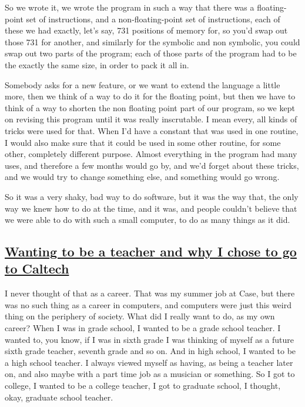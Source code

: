 \documentclass[]{article}
\begin{document}
So we wrote it, we wrote the program in such a way that there was a
floating-point set of instructions, and a non-floating-point set of
instructions, each of these we had exactly, let's say, 731 positions of
memory for, so you'd swap out those 731 for another, and similarly for
the symbolic and non symbolic, you could swap out two parts of the
program; each of those parts of the program had to be the exactly the
same size, in order to pack it all in.

Somebody asks for a new feature, or we want to extend the language a
little more, then we think of a way to do it for the floating point, but
then we have to think of a way to shorten the non floating point part of
our program, so we kept on revising this program until it was really
inscrutable. I mean every, all kinds of tricks were used for that. When
I'd have a constant that was used in one routine, I would also make sure
that it could be used in some other routine, for some other, completely
different purpose. Almost everything in the program had many uses, and
therefore a few months would go by, and we'd forget about these tricks,
and we would try to change something else, and something would go wrong.

So it was a very shaky, bad way to do software, but it was the way that,
the only way we knew how to do at the time, and it was, and people
couldn't believe that we were able to do with such a small computer, to
do as many things as it did.

\subsection{\texorpdfstring{\href{http://webofstories.com/play/17085}{Wanting
to be a teacher and why I chose to go to
Caltech}}{Wanting to be a teacher and why I chose to go to Caltech}}\label{wanting-to-be-a-teacher-and-why-i-chose-to-go-to-caltech}

I never thought of that as a career. That was my summer job at Case, but
there was no such thing as a career in computers, and computers were
just this weird thing on the periphery of society. What did I really
want to do, as my own career? When I was in grade school, I wanted to be
a grade school teacher. I wanted to, you know, if I was in sixth grade I
was thinking of myself as a future sixth grade teacher, seventh grade
and so on. And in high school, I wanted to be a high school teacher. I
always viewed myself as having, as being a teacher later on, and also
maybe with a part time job as a musician or something. So I got to
college, I wanted to be a college teacher, I got to graduate school, I
thought, okay, graduate school teacher.
\end{document}
